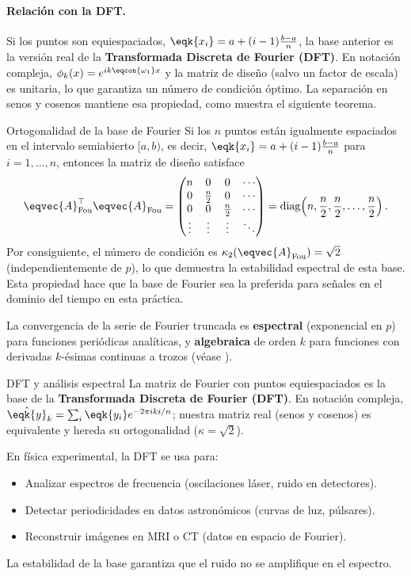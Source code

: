 \paragraph{Relación con la DFT.}
Si los puntos son equiespaciados, $\eqk{x_i} = a + (i-1)\frac{b-a}{n}$, la base anterior
es la versión real de la \textbf{Transformada Discreta de Fourier (DFT)}.
En notación compleja, $\phi_k(x)=e^{i k \eqcon{\omega_1} x}$ y la matriz de diseño (salvo un
factor de escala) es unitaria, lo que garantiza un número de condición óptimo.
La separación en senos y cosenos mantiene esa propiedad, como muestra el siguiente teorema.

\begin{teorema}{Ortogonalidad de la base de Fourier}
\label{thm:fourier_orto}
Si los $n$ puntos están igualmente espaciados en el intervalo semiabierto $[a,b)$,
es decir, $\eqk{x_i} = a + (i-1)\frac{b-a}{n}$ para $i=1,\dots,n$, entonces la matriz de
diseño satisface
\[
  \eqvec{A}_{\mathrm{Fou}}^\top \eqvec{A}_{\mathrm{Fou}} =
  \begin{pmatrix}
    n & 0 & 0 & \cdots \\
    0 & \frac{n}{2} & 0 & \cdots \\
    0 & 0 & \frac{n}{2} & \cdots \\
    \vdots & \vdots & \vdots & \ddots
  \end{pmatrix}
  = \operatorname{diag}\!\left(n, \frac{n}{2}, \frac{n}{2}, \dots, \frac{n}{2}\right).
\]
Por consiguiente, el número de condición es $\kappa_2(\eqvec{A}_{\mathrm{Fou}}) = \sqrt{2}$
(independientemente de $p$), lo que demuestra la estabilidad espectral de esta base.
Esta propiedad hace que la base de Fourier sea la preferida para señales en el dominio
del tiempo en esta práctica.
\end{teorema}

La convergencia de la serie de Fourier truncada es \textbf{espectral} (exponencial en $p$)
para funciones periódicas analíticas, y \textbf{algebraica} de orden $k$ para funciones
con derivadas $k$-ésimas continuas a trozos (véase ).

\begin{fisicaconexion}{DFT y análisis espectral}
La matriz de Fourier con puntos equiespaciados es la base de la \textbf{Transformada Discreta de Fourier (DFT)}. En notación compleja, $\hat{\eqk{y}}_k = \sum_i \eqk{y_i} e^{-2\pi i k i/n}$; nuestra matriz real (senos y cosenos) es equivalente y hereda su ortogonalidad ($\kappa=\sqrt{2}$). 

En física experimental, la DFT se usa para:
\begin{itemize}
  \item Analizar espectros de frecuencia (oscilaciones láser, ruido en detectores).
  \item Detectar periodicidades en datos astronómicos (curvas de luz, púlsares).
  \item Reconstruir imágenes en MRI o CT (datos en espacio de Fourier).
\end{itemize}
La estabilidad de la base garantiza que el ruido no se amplifique en el espectro.
\end{fisicaconexion}


